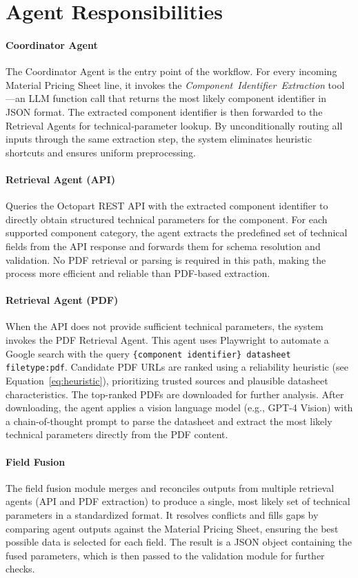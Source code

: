 \section{Agent Responsibilities}

\paragraph{Coordinator Agent}  
The Coordinator Agent is the entry point of the workflow. For every incoming Material Pricing Sheet line, it invokes the \emph{Component~Identifier~Extraction} tool—an LLM function call that returns the most likely component identifier in JSON format. The extracted component identifier is then forwarded to the Retrieval Agents for technical‐parameter lookup. By unconditionally routing all inputs through the same extraction step, the system eliminates heuristic shortcuts and ensures uniform preprocessing.


\paragraph{Retrieval Agent (API)}  
Queries the Octopart REST API with the extracted component identifier to directly obtain structured technical parameters for the component.  
For each supported component category, the agent extracts the predefined set of technical fields from the API response and forwards them for schema resolution and validation.  
No PDF retrieval or parsing is required in this path, making the process more efficient and reliable than PDF-based extraction.

\paragraph{Retrieval Agent (PDF)}  
When the API does not provide sufficient technical parameters, the system invokes the PDF Retrieval Agent. This agent uses Playwright to automate a Google search with the query  
\texttt{\{component identifier\} datasheet filetype:pdf}.  
Candidate PDF URLs are ranked using a reliability heuristic (see Equation~\ref{eq:heuristic}), prioritizing trusted sources and plausible datasheet characteristics. The top-ranked PDFs are downloaded for further analysis.  
After downloading, the agent applies a vision language model (e.g., GPT-4 Vision) with a chain-of-thought prompt to parse the datasheet and extract the most likely technical parameters directly from the PDF content.

\paragraph{Field Fusion}
The field fusion module merges and reconciles outputs from multiple retrieval agents (API and PDF extraction) to produce a single, most likely set of technical parameters in a standardized format. It resolves conflicts and fills gaps by comparing agent outputs against the Material Pricing Sheet, ensuring the best possible data is selected for each field. The result is a JSON object containing the fused parameters, which is then passed to the validation module for further checks.

